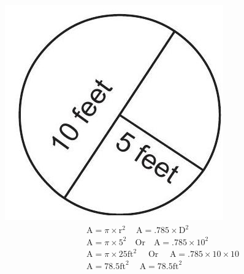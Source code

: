 \documentclass[10pt]{article}
\begin{document}
\includegraphics[max width=\textwidth]{2022_09_11_72dbedc910e6e984560cg-27(3)}
$$
\begin{aligned}
& \mathrm{A}=\pi \times \mathrm{r}^{2} \quad \mathrm{~A}=.785 \times \mathrm{D}^{2} \\
& \mathrm{A}=\pi \times 5^{2} \quad \mathrm{Or} \quad \mathrm{A}=.785 \times 10^{2} \\
& \mathrm{A}=\pi \times 25 \mathrm{ft}^{2} \quad \text { Or } \quad \mathrm{A}=.785 \times 10 \times 10 \\
& \mathrm{A}=78.5 \mathrm{ft}^{2} \quad \mathrm{~A}=78.5 \mathrm{ft}^{2} 
\end{aligned}
$$
\end{document}
